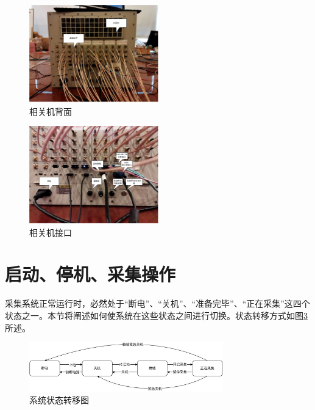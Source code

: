 \documentclass[11pt,includemp,a4paper]{article}
\begin{document}
\begin{figure}
    \begin{center}
        \includegraphics[width=0.5\textwidth]{back.pdf}
    \end{center}
    \caption{\label{fig:daq_back}相关机背面}
\end{figure}


\begin{figure}
    \begin{center}
        \includegraphics[width=0.5\textwidth]{port.pdf}
    \end{center}
    \caption{\label{fig:daq_port}相关机接口}
\end{figure}


\section{启动、停机、采集操作}
采集系统正常运行时，必然处于“断电”、“关机”、“准备完毕”、“正在采集”这四个状态之一。本节将阐述如何使系统在这些状态之间进行切换。状态转移方式如图\ref{fig:states}所述。
\begin{figure}
    \begin{center}
        \includegraphics[width=0.75\textwidth]{state_diag.pdf}
    \end{center}
    \caption{\label{fig:states}系统状态转移图}
\end{figure}
\end{document}
